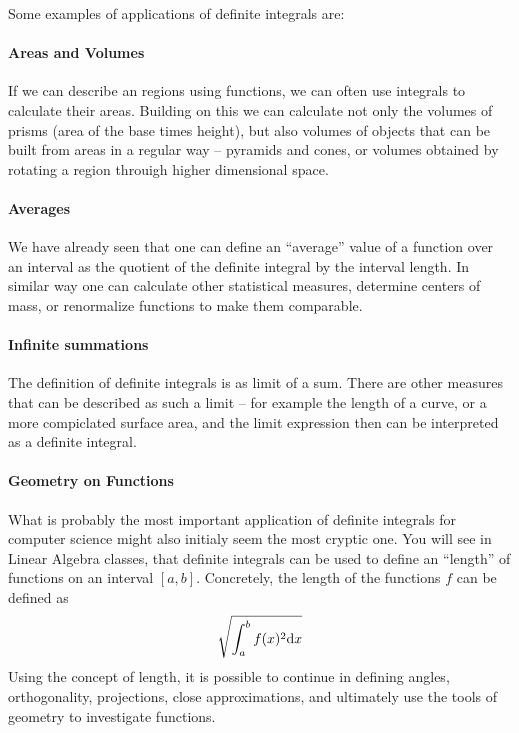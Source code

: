 Some examples of applications of definite integrals are:
\paragraph{Areas and Volumes}
If we can describe an regions using functions, we can often use integrals to calculate their areas. Building on this we can calculate not
only the volumes of prisms (area of the base times height), but also volumes of objects that can be built from areas in a regular way --
pyramids and cones, or volumes obtained by rotating a region throuigh higher dimensional space.
\paragraph{Averages}
We have already seen that one can define an ``average'' value of a function over an interval as the quotient of the definite integral by
the interval length. In similar way one can calculate other statistical measures, determine centers of mass, or renormalize functions to
make them comparable.
\paragraph{Infinite summations}
The definition of definite integrals is as limit of a sum. There are other measures that can be described as such a limit -- for example
the length of a curve, or a more compiclated surface area, and the limit expression then can be interpreted as a definite integral.
\paragraph{Geometry on Functions}
What is probably the most important application of definite integrals for
computer science might also initialy seem the most cryptic one. You will see
in Linear Algebra classes, that definite integrals can be used to define an
``length'' of functions on an interval $[a,b]$. Concretely, the length of
the functions $f$ can be defined as
\[
\sqrt{
\int_a^b f(x)^2{\mbox{d}}x}
\]
Using the concept of length, it is possible to continue in defining angles,
orthogonality, projections, close approximations, and ultimately use the
tools of geometry to investigate functions.


